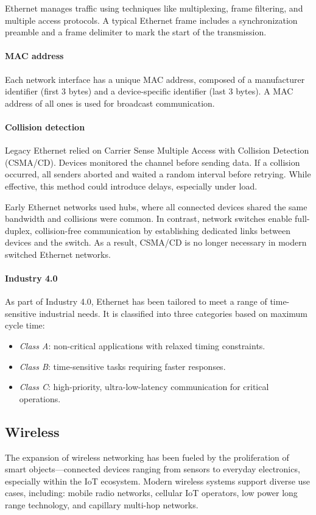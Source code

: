 Ethernet manages traffic using techniques like multiplexing, frame filtering, and multiple access protocols. 
A typical Ethernet frame includes a synchronization preamble and a frame delimiter to mark the start of the transmission.

\paragraph*{MAC address}
Each network interface has a unique MAC address, composed of a manufacturer identifier (first 3 bytes) and a device-specific identifier (last 3 bytes). 
A MAC address of all ones is used for broadcast communication.

\paragraph*{Collision detection}
Legacy Ethernet relied on Carrier Sense Multiple Access with Collision Detection (CSMA/CD). 
Devices monitored the channel before sending data. 
If a collision occurred, all senders aborted and waited a random interval before retrying. 
While effective, this method could introduce delays, especially under load.

Early Ethernet networks used hubs, where all connected devices shared the same bandwidth and collisions were common. 
In contrast, network switches enable full-duplex, collision-free communication by establishing dedicated links between devices and the switch. 
As a result, CSMA/CD is no longer necessary in modern switched Ethernet networks.

\paragraph*{Industry 4.0}
As part of Industry 4.0, Ethernet has been tailored to meet a range of time-sensitive industrial needs. 
It is classified into three categories based on maximum cycle time:
\begin{itemize}
    \item \textit{Class A}: non-critical applications with relaxed timing constraints.
    \item \textit{Class B}: time-sensitive tasks requiring faster responses.
    \item \textit{Class C}: high-priority, ultra-low-latency communication for critical operations.
\end{itemize}

\subsection{Wireless}
The expansion of wireless networking has been fueled by the proliferation of smart objects—connected devices ranging from sensors to everyday electronics, especially within the IoT ecosystem. 
Modern wireless systems support diverse use cases, including: mobile radio networks, cellular IoT operators, low power long range technology, and capillary multi-hop networks.